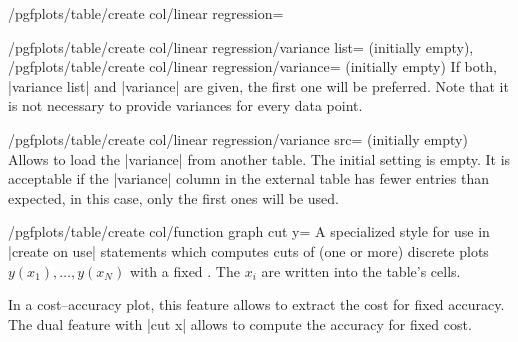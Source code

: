 \begin{stylekey}{/pgfplots/table/create col/linear regression=}
\begin{keylist}{%
		/pgfplots/table/create col/linear regression/variance list= (initially empty),%
		/pgfplots/table/create col/linear regression/variance= (initially empty)%
	}
	If both, |variance list| and |variance| are given, the first one will be preferred. Note that it is not necessary to provide variances for every data point.
	\end{keylist}

	\begin{key}{/pgfplots/table/create col/linear regression/variance src= (initially empty)}
	Allows to load the |variance| from another table. The initial setting is empty. It is acceptable if the |variance| column in the external table has fewer entries than expected, in this case, only the first ones will be used.
	\end{key}
\end{stylekey}

\begin{stylekey}{/pgfplots/table/create col/function graph cut y=}
	A specialized style for use in |create on use| statements which computes cuts of (one or more) discrete plots $y(x_1), \dotsc, y(x_N)$ with a fixed . The $x_i$ are written into the table's cells.

	In a cost--accuracy plot, this feature allows to extract the cost for fixed accuracy. The dual feature with |cut x| allows to compute the accuracy for fixed cost.
	
	\pgfplotsset{anchor=center,/tikz/baseline}
\begin{codeexample}[]
	\loadedtable

\pgfplotstabletypeset{\loadedtable}


\end{codeexample}
\end{stylekey}
